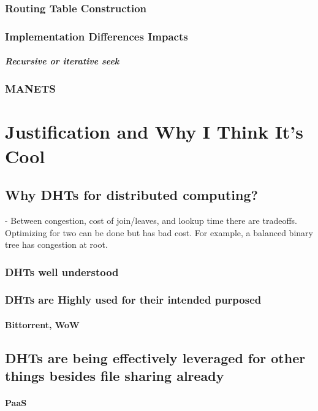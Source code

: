 \documentclass[10pt,letterpaper]{report}
\begin{document}
\subsection{Routing Table Construction}
\subsection{Implementation Differences Impacts}
\paragraph{Recursive or iterative seek}


\subsection{MANETS}
\chapter{Justification and Why I Think It's Cool}

\section{Why DHTs for distributed computing?}

\cite{malkhi2001viceroy} -  Between congestion, cost of join/leaves, and lookup time there are tradeoffs.  
Optimizing for two can be done but has bad cost.
For example, a balanced binary tree has congestion at root.
\subsection{DHTs well understood}
\subsection{DHTs are Highly used for their intended purposed}
\subsubsection{Bittorrent, WoW}
\section{DHTs are being effectively leveraged for other things besides file sharing already}

\subsubsection{PaaS}
\end{document}
